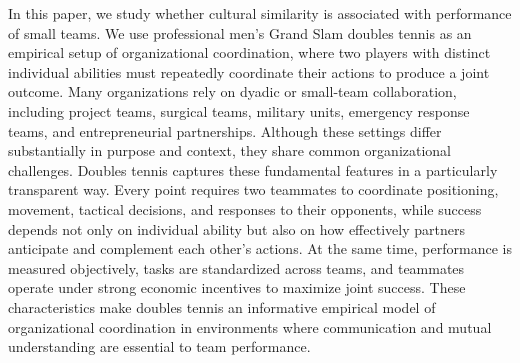 \documentclass[10pt]{article}
\begin{document}
In this paper, we study whether cultural similarity is associated with performance of small teams. We use professional men's Grand Slam doubles tennis as an empirical setup of organizational coordination, where two players with distinct individual abilities must repeatedly coordinate their actions to produce a joint outcome.  Many organizations rely on dyadic or small-team collaboration, including project teams, surgical teams, military units, emergency response teams, and entrepreneurial partnerships.  Although these settings differ substantially in purpose and context, they share common organizational challenges. %
Doubles tennis captures these fundamental features in a particularly transparent way. Every point requires two teammates to coordinate positioning, movement, tactical decisions, and responses to their opponents, while success depends not only on individual ability but also on how effectively partners anticipate and complement each other's actions. At the same time, performance is measured objectively, tasks are standardized across teams, and teammates operate under strong economic incentives to maximize joint success. These characteristics make doubles tennis an informative empirical model of organizational coordination in environments where communication and mutual understanding are essential to team performance.
\end{document}
